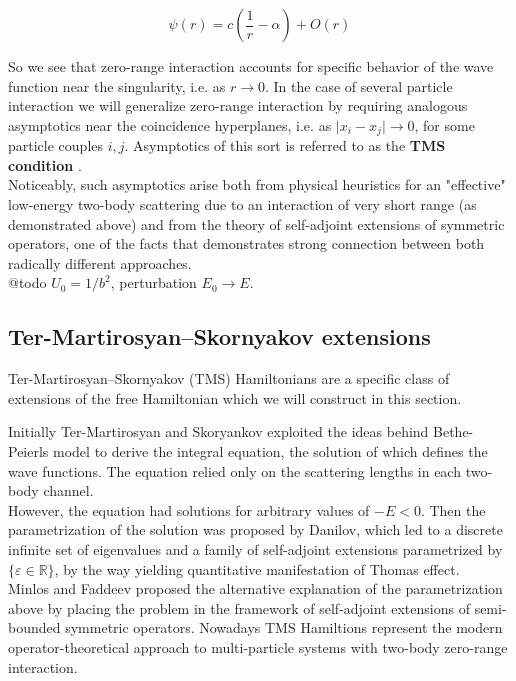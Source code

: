 \documentclass[11pt, a4paper, german]{article}
\theoremstyle{plain}
\theoremstyle{definition}
\theoremstyle{remark}
\numberwithin{equation}{section}
\numberwithin{theorem}{section}
\begin{document}
\begin{equation}
\psi(r) = c\left(\frac 1r - \alpha \right) + O(r)\label{eq:tms-condition}
\end{equation}

So we see that zero-range interaction accounts for specific behavior of the wave function near the singularity, i.e. as $r\rightarrow 0$. In the case of several particle interaction we will generalize zero-range interaction by requiring analogous asymptotics near the coincidence hyperplanes, i.e. as $\vert x_i - x_j \vert \rightarrow 0$, for some particle couples $i, j$. Asymptotics of this sort is referred to as the \textbf{TMS condition} \cite{A2}.\\

Noticeably, such asymptotics arise both from physical heuristics for an "effective" low-energy two-body scattering due to an interaction of very short range (as demonstrated above) and from the theory of self-adjoint extensions of symmetric operators, one of the facts that demonstrates strong connection between both radically different approaches.\\

@todo $U_0 = 1/b^2$, perturbation $E_0\rightarrow E$.

\subsection{Ter-Martirosyan--Skornyakov extensions}

Ter-Martirosyan--Skornyakov (TMS) Hamiltonians are a specific class of extensions of the free Hamiltonian which we will construct in this section.

Initially Ter-Martirosyan and Skoryankov exploited the ideas behind Bethe-Peierls model to derive the integral equation, the solution of which defines the wave functions. The equation relied only on the scattering lengths in each two-body channel.\\

However, the equation had solutions for arbitrary values of $-E < 0$. Then the parametrization of the solution was proposed by Danilov, which led to a discrete infinite set of eigenvalues and a family of self-adjoint extensions parametrized by $\{\varepsilon \in \mathbb R\}$, by the way yielding quantitative manifestation of Thomas effect.\\

Minlos and Faddeev proposed the alternative explanation of the parametrization above by placing the problem in the framework of self-adjoint extensions of semi-bounded symmetric operators. Nowadays TMS Hamiltions represent the modern operator-theoretical approach to multi-particle systems with two-body zero-range interaction.\\
\end{document}
